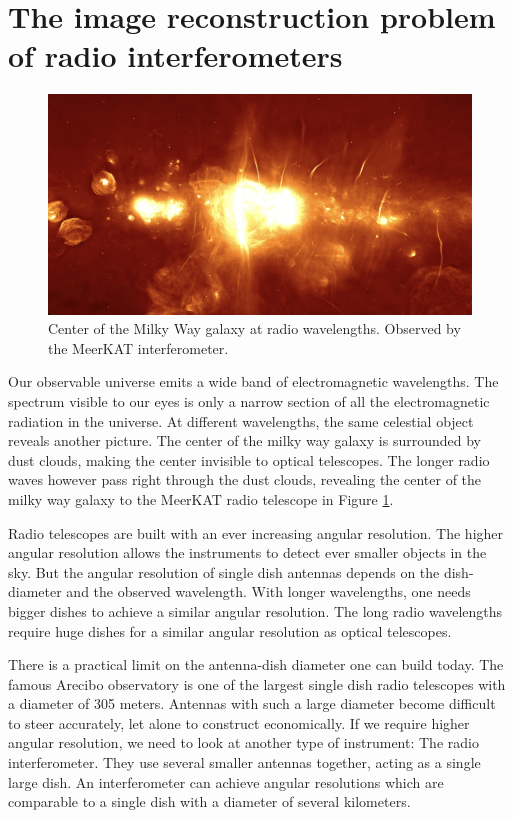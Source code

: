 \section{The image reconstruction problem of radio interferometers}
\begin{figure}[h]
	\includegraphics[width=\linewidth]{./chapters/01.intro/MeerKAT_milkyWay.jpg}
	\caption{Center of the Milky Way galaxy at radio wavelengths. Observed by the MeerKAT interferometer.}
	\label{intro:milky}
\end{figure}

Our observable universe emits a wide band of electromagnetic wavelengths. The spectrum visible to our eyes is only a narrow section of all the electromagnetic radiation in the universe. At different wavelengths, the same celestial object reveals another picture. The center of the milky way galaxy is surrounded by dust clouds, making the center invisible to optical telescopes. The longer radio waves however pass right through the dust clouds, revealing the center of the milky way galaxy to the MeerKAT radio telescope in Figure \ref{intro:milky}.

Radio telescopes are built with an ever increasing angular resolution. The higher angular resolution allows the instruments to detect ever smaller objects in the sky. But the angular resolution of single dish antennas depends on the dish-diameter and the observed wavelength. With longer wavelengths, one needs bigger dishes to achieve a similar angular resolution. The long radio wavelengths require huge dishes for a similar angular resolution as optical telescopes.

There is a practical limit on the antenna-dish diameter one can build today. The famous Arecibo observatory is one of the largest single dish radio telescopes with a diameter of 305 meters. Antennas with such a large diameter become difficult to steer accurately, let alone to construct economically. If we require higher angular resolution, we need to look at another type of instrument: The radio interferometer. They use several smaller antennas together, acting as a single large dish. An interferometer can achieve angular resolutions which are comparable to a single dish with a diameter of several kilometers.

